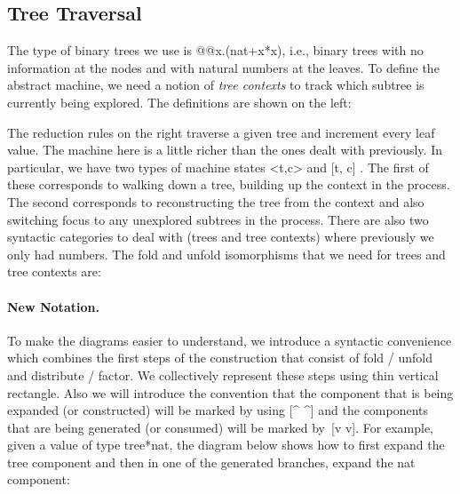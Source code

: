 \documentclass{llncs}
\begin{document}
\subsection{Tree Traversal}
\label{sec:tree}

The type of binary trees we use is {{@@x.(nat+x*x)}}, i.e., binary trees with
no information at the nodes and with natural numbers at the leaves. To define
the abstract machine, we need a notion of \emph{tree contexts} to track which
subtree is currently being explored. The definitions are shown on the left:

\vspace{-15pt}
\begin{small}
\begin{multicols}{2}
%

\end{multicols}
\end{small}

The reduction rules on the right traverse a given tree and increment
every leaf value.  The machine here is a little richer than the ones
dealt with previously. In particular, we have two types of machine
states {{<t,c>}} and {{ {[t, c]} }}. The first of these corresponds
to walking down a tree, building up the context in the process. The
second corresponds to reconstructing the tree from the context and
also switching focus to any unexplored subtrees in the process. There
are also two syntactic categories to deal with (trees and tree
contexts) where previously we only had numbers. The {{fold}} and
{{unfold}} isomorphisms that we need for trees and tree contexts are:

\begin{small}
  
\end{small}

\paragraph*{New Notation.}
To make the diagrams easier to understand, we introduce a syntactic
convenience which combines the first steps of the construction that consist
of {{fold}} / {{unfold}} and {{distribute}} / {{factor}}. We collectively
represent these steps using thin vertical rectangle. Also we will introduce
the convention that the component that is being expanded (or constructed) will be
marked by using {{[^ ^]}} and the components that are being generated (or consumed) will be
marked by~{{[v v]}}. For example, given a value of type {{tree*nat}}, the
diagram below shows how to first expand the {{tree}} component and then in
one of the generated branches, expand the {{nat}} component:
\end{document}

